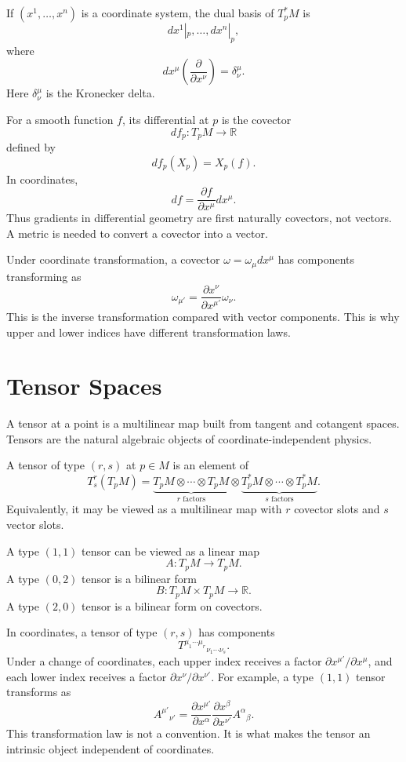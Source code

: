 If \((x^1,\ldots,x^n)\) is a coordinate system, the dual basis of \(T_p^*M\) is
\[
dx^1|_p,\ldots,dx^n|_p,
\]
where
\[
dx^\mu\left(\frac{\partial}{\partial x^\nu}\right)=\delta^\mu_{\nu}.
\]
Here \(\delta^\mu_{\nu}\) is the Kronecker delta.

For a smooth function \(f\), its differential at \(p\) is the covector
\[
df_p:T_pM\to \mathbb{R}
\]
defined by
\[
df_p(X_p)=X_p(f).
\]
In coordinates,
\[
df=\frac{\partial f}{\partial x^\mu}dx^\mu.
\]
Thus gradients in differential geometry are first naturally covectors, not
vectors. A metric is needed to convert a covector into a vector.

Under coordinate transformation, a covector \(\omega=\omega_\mu dx^\mu\) has
components transforming as
\[
\omega_{\mu'}=
\frac{\partial x^\nu}{\partial x^{\mu'}}\omega_\nu.
\]
This is the inverse transformation compared with vector components. This is why
upper and lower indices have different transformation laws.

\clearpage

\section{Tensor Spaces}

A tensor at a point is a multilinear map built from tangent and cotangent
spaces. Tensors are the natural algebraic objects of coordinate-independent
physics.

\begin{definitionbox}
A tensor of type \((r,s)\) at \(p\in M\) is an element of
\[
T^r_s(T_pM)=
\underbrace{T_pM\otimes\cdots\otimes T_pM}_{r\text{ factors}}
\otimes
\underbrace{T_p^*M\otimes\cdots\otimes T_p^*M}_{s\text{ factors}}.
\]
Equivalently, it may be viewed as a multilinear map with \(r\) covector slots
and \(s\) vector slots.
\end{definitionbox}

A type \((1,1)\) tensor can be viewed as a linear map
\[
A:T_pM\to T_pM.
\]
A type \((0,2)\) tensor is a bilinear form
\[
B:T_pM\times T_pM\to \mathbb{R}.
\]
A type \((2,0)\) tensor is a bilinear form on covectors.

In coordinates, a tensor of type \((r,s)\) has components
\[
T^{\mu_1\cdots\mu_r}{}_{\nu_1\cdots\nu_s}.
\]
Under a change of coordinates, each upper index receives a factor
\(\partial x^{\mu'}/\partial x^\mu\), and each lower index receives a factor
\(\partial x^\nu/\partial x^{\nu'}\). For example, a type \((1,1)\) tensor
transforms as
\[
A^{\mu'}{}_{\nu'}=
\frac{\partial x^{\mu'}}{\partial x^\alpha}
\frac{\partial x^\beta}{\partial x^{\nu'}}
A^\alpha{}_{\beta}.
\]
This transformation law is not a convention. It is what makes the tensor an
intrinsic object independent of coordinates.

